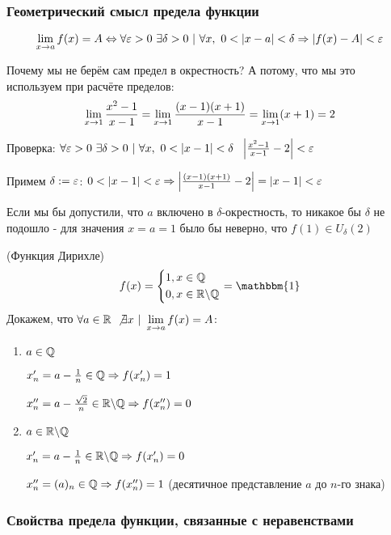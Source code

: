 \subsubsection*{Геометрический смысл предела функции}

$$
	\lim\limits_{x \rightarrow a} f(x) = A \Leftrightarrow \forall \varepsilon > 0\ \exists \delta > 0\ |\ \forall x,\ 0 < |x - a| < \delta \Rightarrow |f(x) - A| < \varepsilon
$$


\begin{example}
	Почему мы не берём сам предел в окрестность? А потому, что мы это используем при расчёте пределов:
	$$
		\lim\limits_{x \rightarrow 1} \frac{x^2 - 1}{x - 1} = \lim\limits_{x \rightarrow 1} \frac{(x - 1)(x + 1)}{x - 1} = \lim\limits_{x \rightarrow 1} (x + 1) = 2
	$$
	
	Проверка:
	$\forall \eps > 0\ \exists \delta > 0\ |\ \forall x,\ 0 < |x - 1| < \delta\ \ \left|\frac{x^2 - 1}{x - 1} - 2\right| < \eps$
	
	Примем $\delta := \varepsilon$: $0 < |x - 1| < \varepsilon \Rightarrow \left|\frac{(x - 1)(x + 1)}{x - 1} - 2\right| = |x - 1| < \varepsilon$
	
	Если мы бы допустили, что $a$ включено в $\delta$-окрестность, то никакое бы $\delta$ не подошло - для значения $x = a = 1$ было бы неверно, что $f(1) \in U_{\delta}(2)$
\end{example}

\begin{example} (Функция Дирихле)
	\[
		f(x) = \System{&{1, x \in \Q} \\ &{0, x \in \R \bs \Q}} = \mathbbm{1}
	\]
	Докажем, что $\forall a \in \mathbb{R}\ \not\exists x\ |\ \lim\limits_{x \rightarrow a} f(x) = A$:
	
	\begin{enumerate}
		\item $a \in \mathbb{Q}$
		
		$x'_n = a - \frac{1}{n} \in \mathbb{Q} \Rightarrow f(x'_n) = 1$
		
		$x''_n = a - \frac{\sqrt{2}}{n} \in \mathbb{R} \backslash \mathbb{Q} \Rightarrow f(x''_n) = 0$
		
		\item $a \in \mathbb{R} \backslash \mathbb{Q}$
		
		$x'_n = a - \frac{1}{n} \in \mathbb{R} \backslash \mathbb{Q} \Rightarrow f(x'_n) = 0$
		
		$x''_n = (a)_n \in \mathbb{Q} \Rightarrow f(x''_n) = 1$ (десятичное представление $a$ до $n$-го знака)
	\end{enumerate}
\end{example}

\subsubsection*{Свойства предела функции, связанные с неравенствами}

